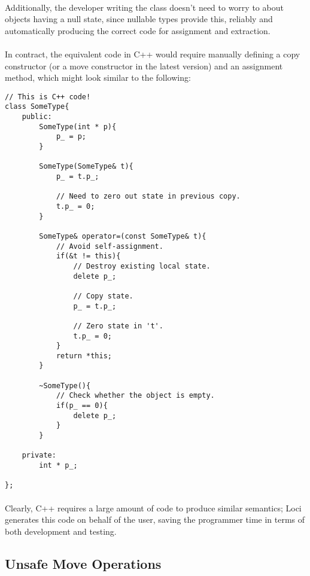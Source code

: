 \documentclass[12pt,twoside,notitlepage]{report}
\begin{document}
\paragraph{}
Additionally, the developer writing the class doesn't need to worry to about objects having a null state, since nullable types provide this, reliably and automatically producing the correct code for assignment and extraction.

\paragraph{}
In contract, the equivalent code in C++ would require manually defining a copy constructor (or a move constructor in the latest version) and an assignment method, which might look similar to the following:

\begin{lstlisting}
// This is C++ code!
class SomeType{
	public:
		SomeType(int * p){
			p_ = p;
		}
		
		SomeType(SomeType& t){
			p_ = t.p_;
			
			// Need to zero out state in previous copy.
			t.p_ = 0;
		}
		
		SomeType& operator=(const SomeType& t){
			// Avoid self-assignment.
			if(&t != this){
				// Destroy existing local state.
				delete p_;
				
				// Copy state.
				p_ = t.p_;
				
				// Zero state in 't'.
				t.p_ = 0;
			}
			return *this;
		}
		
		~SomeType(){
			// Check whether the object is empty.
			if(p_ == 0){
				delete p_;
			}
		}
	
	private:
		int * p_;
	
};
\end{lstlisting}


\paragraph{}
Clearly, C++ requires a large amount of code to produce similar semantics; Loci generates this code on behalf of the user, saving the programmer time in terms of both development and testing.

\clearpage

\subsection{Unsafe Move Operations}
\end{document}
